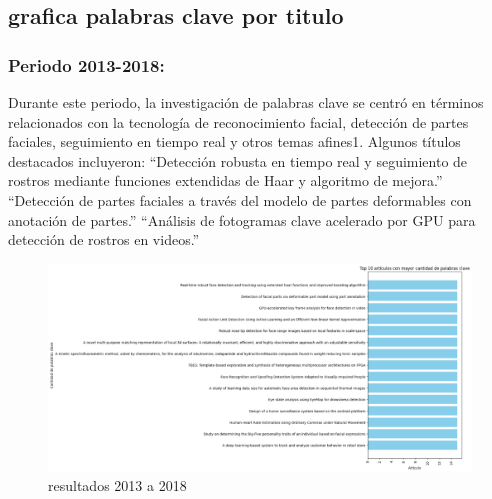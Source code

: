 \documentclass[conference]{IEEEtran}
\begin{document}
\subsection{grafica palabras clave por titulo}

\subsubsection{Periodo 2013-2018:}
Durante este periodo, la investigación de palabras clave se centró en términos relacionados con la tecnología de reconocimiento facial, detección de partes faciales, seguimiento en tiempo real y otros temas afines1.
Algunos títulos destacados incluyeron:
“Detección robusta en tiempo real y seguimiento de rostros mediante funciones extendidas de Haar y algoritmo de mejora.”
“Detección de partes faciales a través del modelo de partes deformables con anotación de partes.”
“Análisis de fotogramas clave acelerado por GPU para detección de rostros en videos.”
\begin{figure}[H]
    \centering
    \includegraphics[width=1\linewidth]{palabrasclavetitulos2013.png}
    \caption{resultados 2013 a 2018}
    \label{fig:enter-label}
\end{figure}
\end{document}

